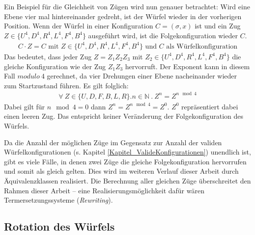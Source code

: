 \documentclass[12pt,a4paper, usenames, dvipsnames]{article}
\theoremstyle{mystyle}
\theoremstyle{definition}
\begin{document}
Ein Beispiel für die Gleichheit von Zügen wird nun genauer betrachtet: Wird eine Ebene vier mal hintereinander gedreht, ist der Würfel wieder in der vorherigen Position. Wenn der Würfel in einer Konfiguration $C = (\sigma, x)$ ist und ein Zug $Z \in \{ U^4, D^4, R^4, L^4, F^4, B^4\}$ ausgeführt wird, ist die Folgekonfiguration wieder $C$.
\begin{align*}
C \cdot Z = C  \text{ mit } Z \in \{ U^4, D^4, R^4, L^4, F^4, B^4\} \text{ und } C \text{ als Würfelkonfiguration}
\end{align*}
Das bedeutet, dass jeder Zug $Z = Z_1Z_2Z_3$ mit $Z_2 \in \{ U^4, D^4, R^4, L^4, F^4, B^4\}$ die gleiche Konfiguration wie der Zug $Z_1Z_3$ hervorruft.
Der Exponent kann in diesem Fall $modulo \ 4$ gerechnet, da vier Drehungen einer Ebene nacheinander wieder zum Startzustand führen. 
Es gilt folglich:
\begin{align*}
\forall \  Z \in \{U, D, F, B, L, R\}. n \in \mathbb{N} \ . \ Z^n=Z^{n \mod 4}
\end{align*}
Dabei gilt für $n \mod 4 = 0$ dann $Z^n = Z^{n \mod 4} = Z^0$. $Z^0$ repräsentiert dabei einen leeren Zug. Das entspricht keiner Veränderung der Folgekonfiguration des Würfels.

Da die Anzahl der möglichen Züge im Gegensatz zur Anzahl der validen Würfelkonfigurationen (s. Kapitel \ref{Kapitel_ValideKonfigurationen}) unendlich ist, gibt es viele Fälle, in denen zwei Züge die gleiche Folgekonfiguration hervorrufen und somit als gleich gelten. Dies wird im weiteren Verlauf dieser Arbeit durch Äquivalenzklassen realisiert. Die Berechnung aller gleichen Züge überschreitet den Rahmen dieser Arbeit -- eine Realisierungsmöglichkeit dafür wären Termersetzungssysteme (\textit{Rewriting}).


%
%
%
%
%
%
%
%
%
%

\subsection{Rotation des Würfels}
\end{document}
